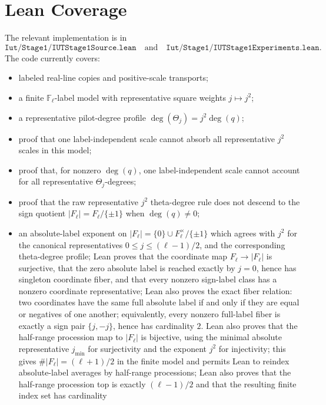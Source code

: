\documentclass[11pt]{article}
\newcommand{\F}{\mathbb{F}}
\begin{document}
\section{Lean Coverage}

The relevant implementation is in
\[
\texttt{Iut/Stage1/IUTStage1Source.lean}
\quad\text{and}\quad
\texttt{Iut/Stage1/IUTStage1Experiments.lean}.
\]
The code currently covers:
\begin{itemize}
\item labeled real-line copies and positive-scale transports;
\item a finite \(\F_\ell\)-label model with representative square weights
  \(j \mapsto j^2\);
\item a representative pilot-degree profile
  \(\deg(\Theta_j)=j^2\deg(q)\);
\item proof that one label-independent scale cannot absorb all representative
  \(j^2\) scales in this model;
\item proof that, for nonzero \(\deg(q)\), one label-independent scale cannot
  account for all representative \(\Theta_j\)-degrees;
\item proof that the raw representative \(j^2\) theta-degree rule does not
  descend to the sign quotient \(|F_\ell|=F_\ell/\{\pm1\}\) when \(\deg(q)\ne0\);
\item an absolute-label exponent on \(|F_\ell|=\{0\}\cup F_\ell^\times/\{\pm1\}\)
  which agrees with \(j^2\) for the canonical representatives
  \(0\le j\le(\ell-1)/2\), and the corresponding theta-degree profile;
  Lean proves that the coordinate map \(F_\ell\to |F_\ell|\) is surjective,
  that the zero absolute label is reached exactly by \(j=0\), hence has
  singleton coordinate fiber, and that every nonzero sign-label class has a
  nonzero coordinate representative; Lean also
  proves the exact fiber relation:
  two coordinates have the same full absolute label if and only if they are
  equal or negatives of one another; equivalently, every nonzero full-label
  fiber is exactly a sign pair \(\{j,-j\}\), hence has cardinality \(2\).
  Lean also
  proves that the half-range procession map to \(|F_\ell|\) is bijective, using
  the minimal absolute representative \(j_{\min}\) for surjectivity and the
  exponent \(j^2\) for injectivity; this gives
  \(\#|F_\ell|=(\ell+1)/2\) in the finite model and permits Lean to reindex
  absolute-label averages by half-range processions;
  Lean also proves that the half-range procession top is exactly
  \((\ell-1)/2\) and that the resulting finite index set has cardinality

\end{itemize}
\end{document}
